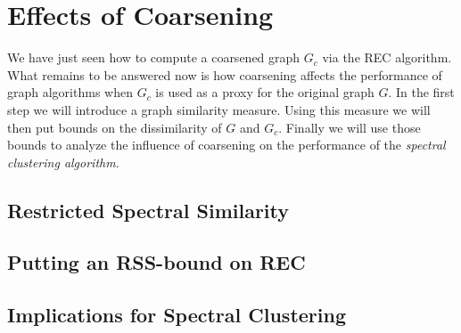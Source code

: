 \section{Effects of Coarsening}%
\label{sec:cons}

We have just seen how to compute a coarsened graph $G_c$ via the REC algorithm.
What remains to be answered now is how coarsening affects the performance of graph algorithms when $G_c$ is used as a proxy for the original graph $G$.
In the first step we will introduce a graph similarity measure.
Using this measure we will then put bounds on the dissimilarity of $G$ and $G_c$.
Finally we will use those bounds to analyze the influence of coarsening on the performance of the \textit{spectral clustering algorithm}.

\subsection{Restricted Spectral Similarity}%
\label{sec:cons:rss}

\subsection{Putting an RSS-bound on REC}%
\label{sec:cons:bound}

\subsection{Implications for Spectral Clustering}%
\label{sec:cons:sc}

